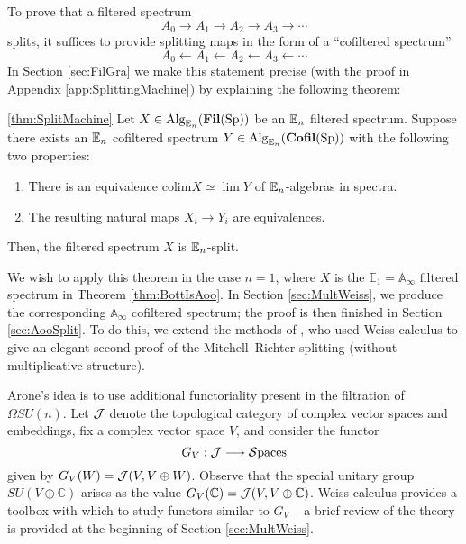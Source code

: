To prove that a filtered spectrum
$$A_0 \longrightarrow A_1 \longrightarrow A_2 \longrightarrow A_3 \longrightarrow \cdots$$
splits, it suffices to provide splitting maps in the form of a ``cofiltered spectrum''
$$A_0 \longleftarrow A_1 \longleftarrow A_2 \longleftarrow A_3 \longleftarrow \cdots$$
In Section \ref{sec:FilGra} we make this statement precise (with the proof in Appendix \ref{app:SplittingMachine}) by explaining the following theorem:

\begin{customthm}{\ref{thm:SplitMachine}}%
Let $X\in \operatorname{\mathrm{Alg}}_{\operatorname{\mathbb{E}}_n}(\operatorname{\mathbf{Fil}}(\operatorname{\mathrm{Sp}}))$ be an $\operatorname{\mathbb{E}}_n$ filtered spectrum.  Suppose there exists an $\operatorname{\mathbb{E}}_n$ cofiltered spectrum $Y\in \operatorname{\mathrm{Alg}}_{\operatorname{\mathbb{E}}_n}(\operatorname{\mathbf{Cofil}}(\operatorname{\mathrm{Sp}}))$ with the following two properties:
\begin{enumerate}
\item There is an equivalence $\mathrm{colim } X \simeq \lim Y$ of $\operatorname{\mathbb{E}}_n$-algebras in spectra.
\item The resulting natural maps $X_i \to Y_i$ are equivalences.  
\end{enumerate}
Then, the filtered spectrum $X$ is $\operatorname{\mathbb{E}}_n$-split.
\end{customthm}

We wish to apply this theorem in the case $n=1$, where $X$ is the $\mathbb{E}_1 = \mathbb{A}_\infty$ filtered spectrum in Theorem \ref{thm:BottIsAoo}.  In Section \ref{sec:MultWeiss}, we produce the corresponding $\mathbb{A}_\infty$ cofiltered spectrum; the proof is then finished in Section \ref{sec:AooSplit}.  To do this, we extend the methods of \cite{Arone}, who used Weiss calculus to give an elegant second proof of the Mitchell--Richter splitting (without multiplicative structure).  

Arone's idea is to use additional functoriality present in the filtration of $\Omega SU(n)$.  Let $\operatorname{\mathcal{J}}$ denote the topological category of complex vector spaces and embeddings, fix a complex vector space $V$, and consider the functor $$G_V:\operatorname{\mathcal{J}} \longrightarrow \mathcal{S}\text{paces}$$
given by $G_V(W)=\operatorname{\mathcal{J}}(V,V \oplus W)$.  Observe that the special unitary group $SU(V \oplus \mathbb{C})$ arises as the value $G_V(\mathbb{C}) = \operatorname{\mathcal{J}} (V,V\oplus \mathbb{C})$.  Weiss calculus provides a toolbox with which to study functors similar to $G_V$ -- a brief review of the theory is provided at the beginning of Section \ref{sec:MultWeiss}.  

